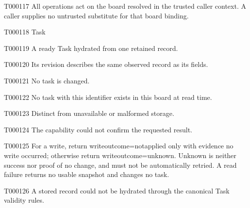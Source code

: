 \documentclass[11pt,a4paper]{article}
\begin{document}
\begin{atlasparagraph}{T000117}
All operations act on the board resolved in the trusted caller context. A caller supplies no untrusted substitute for that board binding.
\end{atlasparagraph}
\begin{atlastext}{T000118}
Task
\end{atlastext}
\begin{atlasparagraph}{T000119}
A ready Task hydrated from one retained record.
\end{atlasparagraph}
\begin{atlasparagraph}{T000120}
Its revision describes the same observed record as its fields.
\end{atlasparagraph}
\begin{atlasparagraph}{T000121}
No task is changed.
\end{atlasparagraph}
\begin{atlasparagraph}{T000122}
No task with this identifier exists in this board at read time.
\end{atlasparagraph}
\begin{atlasparagraph}{T000123}
Distinct from unavailable or malformed storage.
\end{atlasparagraph}
\begin{atlasparagraph}{T000124}
The capability could not confirm the requested result.
\end{atlasparagraph}
\begin{atlasparagraph}{T000125}
For a write, return write\AtlasCharUnderscore{}outcome=not\AtlasCharUnderscore{}applied only with evidence no write occurred; otherwise return write\AtlasCharUnderscore{}outcome=unknown. Unknown is neither success nor proof of no change, and must not be automatically retried. A read failure returns no usable snapshot and changes no task.
\end{atlasparagraph}
\begin{atlasparagraph}{T000126}
A stored record could not be hydrated through the canonical Task validity rules.
\end{atlasparagraph}
\end{document}

